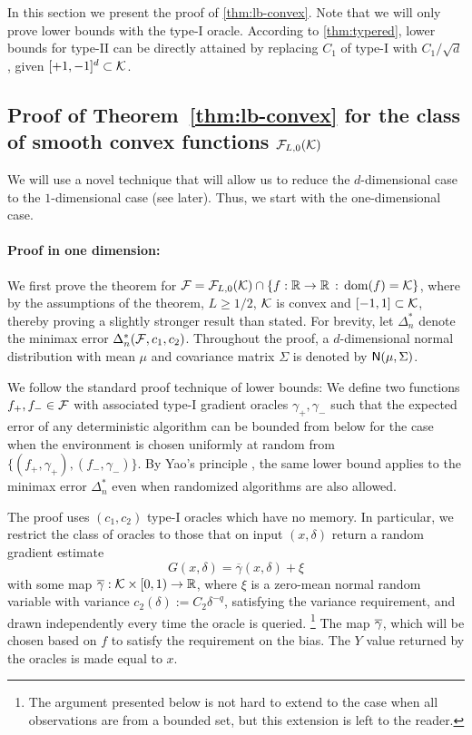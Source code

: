 In this section we present the proof of \cref{thm:lb-convex}. 
Note that we will only prove lower bounds with the type-I oracle. According to \cref{thm:typered}, lower bounds for type-II can be directly attained by replacing $C_1$ of type-I with $C_1/\sqrt{d}$, given $[+1,-1]^d\subset \mathcal{K} $.

\subsection{Proof of Theorem~\ref{thm:lb-convex} for the class of smooth convex functions $\mathcal{F}_{L,0}(\mathcal{K})$}
\label{sec:appendix-lbconvex}
We will use a novel technique that will allow us to  reduce the $d$-dimensional case to the $1$-dimensional case (see later).
Thus, we start with the one-dimensional case.

\paragraph{Proof in one dimension:} 
We first prove the theorem for $\mathcal{F} = \mathcal{F}_{L,0}(\mathcal{K}) \cap\{ f:\mathbb{R} \to\mathbb{R}\,:\, \operatorname{dom}(f)=\mathcal{K}\}$, where 
by the assumptions of the theorem, $L\ge 1/2$, $\mathcal{K}$ is convex and $[-1,1]\subset \mathcal{K}$, thereby proving a slightly
stronger result than stated.
For brevity, let $\Delta_n^{*}$ denote the minimax error $\Delta_n^*(\mathcal{F}, c_1,c_2)$. 
Throughout the proof, a $d$-dimensional normal distribution with mean $\mu$ and covariance matrix $\Sigma$ is denoted by $\mathsf{N}(\mu, \Sigma)$.

We follow the standard proof technique of lower bounds: We define two functions $f_+, f_- \in \mathcal{F}$ with associated type-I gradient oracles $\gamma_+,\gamma_-$ such that the expected error of any deterministic algorithm can be bounded from below for the case when the environment is chosen uniformly at random from $\{(f_+,\gamma_+),(f_-,\gamma_-)\}$. By Yao's principle
\citep{Yao77:FOCS}, the same lower bound applies to the minimax error $\Delta_n^{*}$ even when randomized algorithms are also allowed.

The proof uses $(c_1,c_2)$ type-I oracles which have no memory.
In particular, we restrict the class of oracles to those that on input $(x,\delta)$ return 
a random gradient estimate 
\begin{equation}
\label{eq:oracle}
G(x,\delta) = \overline{\gamma}(x,\delta) + \xi
\end{equation}
with some map $\overline{\gamma}: \mathcal{K} \times [0,1)\to \mathbb{R}$,
where $\xi$ is a zero-mean normal random variable with variance $c_2(\delta):= C_2 \delta^{-q}$, satisfying the variance requirement, and drawn independently every time the oracle is queried.%
\footnote{The argument presented below is not hard to extend to the case when all observations are from a bounded set,
but this extension is left to the reader.}
The map $\overline{\gamma}$, which will be chosen based on $f$ to satisfy the requirement on the bias.
The $Y$ value returned by the oracles is made equal to $x$.

